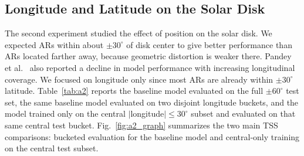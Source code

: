 \documentclass[runningheads]{llncs}
\begin{document}
\subsection{Longitude and Latitude on the Solar Disk}

The second experiment studied the effect of position on the solar disk. We expected ARs within about $\pm 30^\circ$ of disk center to give better performance than ARs located farther away, because geometric distortion is weaker there. Pandey et al.~\cite{ref_long} also reported a decline in model performance with increasing longitudinal coverage. We focused on longitude only since most ARs are already within $\pm30^\circ$ latitude. Table~\ref{tab:a2} reports the baseline model evaluated on the full $\pm60^\circ$ test set, the same baseline model evaluated on two disjoint longitude buckets, and the model trained only on the central $|$longitude$| \leq 30^\circ$ subset and evaluated on that same central test bucket. Fig.~\ref{fig:a2_graph} summarizes the two main TSS comparisons: bucketed evaluation for the baseline model and central-only training on the central test subset.


\begin{table}[H]
\caption{Results for the A2 longitude experiment.}
\label{tab:a2}
\centering
\scriptsize
\setlength{\tabcolsep}{3pt}
\end{table}
\end{document}
